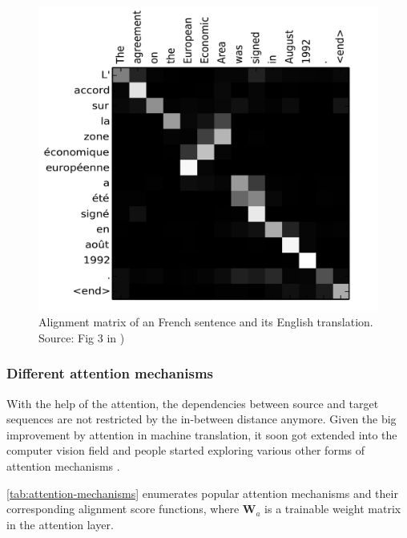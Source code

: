 \begin{figure}[hpt]
    \centering
    \includegraphics[scale=0.3]{images/ch3/alignment-matrix.png}
    \caption{Alignment matrix of an French sentence and its English translation. Source: Fig 3 in \citep{Bahdanau2015})}
    \label{fig:alignment-matrix}
\end{figure}

\subsubsection{Different attention mechanisms}

With the help of the attention, the dependencies between source and target sequences are not restricted by the in-between distance anymore. Given the big improvement by attention in machine translation, it soon got extended into the computer vision field \citep{Xu2015} and people started exploring various other forms of attention mechanisms \citep{Luong2015, Britz2017, Vaswani2017}.

\cref{tab:attention-mechanisms} enumerates popular attention mechanisms and their corresponding alignment score functions, where $\mathbf{W}_a$ is a trainable weight matrix in the attention layer. 

